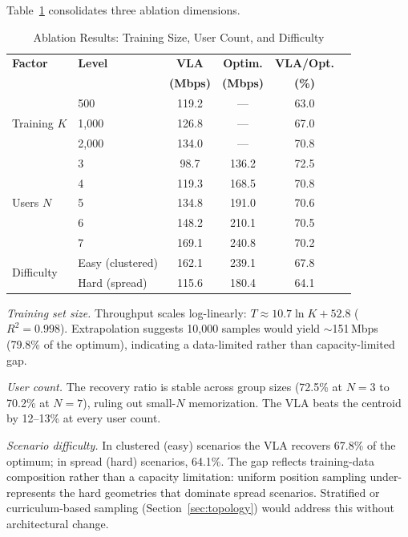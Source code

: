 \documentclass[journal]{IEEEtran}
\begin{document}
Table~\ref{tab:ablation} consolidates three ablation dimensions.

\begin{table}[!t]
    \centering
    \caption{Ablation Results: Training Size, User Count, and Difficulty}
    \label{tab:ablation}
    \footnotesize
    \begin{tabular}{@{}llcccc@{}}
        \toprule
        \textbf{Factor} & \textbf{Level} & \textbf{VLA} & \textbf{Optim.} & \textbf{VLA/Opt.} \\
         & & \textbf{(Mbps)} & \textbf{(Mbps)} & \textbf{(\%)} \\
        \midrule
        \multirow{3}{*}{Training $K$} & 500 & 119.2 & --- & 63.0 \\
         & 1{,}000 & 126.8 & --- & 67.0 \\
         & 2{,}000 & 134.0 & --- & 70.8 \\
        \midrule
        \multirow{5}{*}{Users $N$} & 3 & 98.7 & 136.2 & 72.5 \\
         & 4 & 119.3 & 168.5 & 70.8 \\
         & 5 & 134.8 & 191.0 & 70.6 \\
         & 6 & 148.2 & 210.1 & 70.5 \\
         & 7 & 169.1 & 240.8 & 70.2 \\
        \midrule
        \multirow{2}{*}{Difficulty} & Easy (clustered) & 162.1 & 239.1 & 67.8 \\
         & Hard (spread) & 115.6 & 180.4 & 64.1 \\
        \bottomrule
    \end{tabular}
\end{table}

\emph{Training set size.} Throughput scales log-linearly: $T \approx 10.7 \ln K + 52.8$ ($R^2{=}0.998$). Extrapolation suggests 10{,}000 samples would yield ${\sim}$151\,Mbps (79.8\% of the optimum), indicating a data-limited rather than capacity-limited gap.

\emph{User count.} The recovery ratio is stable across group sizes (72.5\% at $N{=}3$ to 70.2\% at $N{=}7$), ruling out small-$N$ memorization. The VLA beats the centroid by 12--13\% at every user count.

\emph{Scenario difficulty.} In clustered (easy) scenarios the VLA recovers 67.8\% of the optimum; in spread (hard) scenarios, 64.1\%. The gap reflects training-data composition rather than a capacity limitation: uniform position sampling under-represents the hard geometries that dominate spread scenarios. Stratified or curriculum-based sampling (Section~\ref{sec:topology}) would address this without architectural change.
\end{document}
